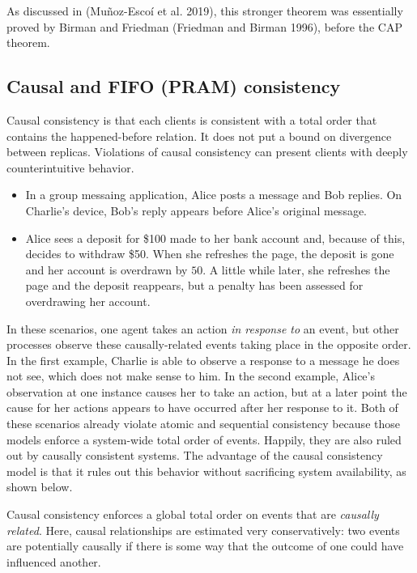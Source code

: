 \documentclass[]             %
{NASA}                       %
\theoremstyle{definition}
\providecommand{\tightlist}{%
  \setlength{\itemsep}{0pt}\setlength{\parskip}{0pt}}
\begin{document}
As discussed in (Muñoz-Escoí et al. 2019), this stronger theorem was
essentially proved by Birman and Friedman (Friedman and Birman 1996),
before the CAP theorem.

\hypertarget{causal-and-fifo-pram-consistency}{%
\subsection{Causal and FIFO (PRAM)
consistency}\label{causal-and-fifo-pram-consistency}}

Causal consistency is that each clients is consistent with a total order
that contains the happened-before relation. It does not put a bound on
divergence between replicas. Violations of causal consistency can
present clients with deeply counterintuitive behavior.

\begin{itemize}
\tightlist
\item
  In a group messaing application, Alice posts a message and Bob
  replies. On Charlie's device, Bob's reply appears before Alice's
  original message.
\item
  Alice sees a deposit for \$100 made to her bank account and, because
  of this, decides to withdraw \$50. When she refreshes the page, the
  deposit is gone and her account is overdrawn by \(50\). A little while
  later, she refreshes the page and the deposit reappears, but a penalty
  has been assessed for overdrawing her account.
\end{itemize}

In these scenarios, one agent takes an action \emph{in response to} an
event, but other processes observe these causally-related events taking
place in the opposite order. In the first example, Charlie is able to
observe a response to a message he does not see, which does not make
sense to him. In the second example, Alice's observation at one instance
causes her to take an action, but at a later point the cause for her
actions appears to have occurred after her response to it. Both of these
scenarios already violate atomic and sequential consistency because
those models enforce a system-wide total order of events. Happily, they
are also ruled out by causally consistent systems. The advantage of the
causal consistency model is that it rules out this behavior without
sacrificing system availability, as shown below.

Causal consistency enforces a global total order on events that are
\emph{causally related}. Here, causal relationships are estimated very
conservatively: two events are potentially causally if there is some way
that the outcome of one could have influenced another.
\end{document}
